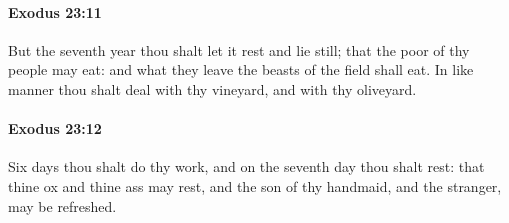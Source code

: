 		\paragraph{Exodus 23:11} %
			\label{EXODUS-23-11}

			But the seventh year thou shalt let it rest and lie still; that the poor of thy people may eat: and what they leave the beasts of the field shall eat. In like manner thou shalt deal with thy vineyard, and with thy oliveyard.


		\paragraph{Exodus 23:12} %
			\label{EXODUS-23-12}

			Six days thou shalt do thy work, and on the seventh day thou shalt rest: that thine ox and thine ass may rest, and the son of thy handmaid, and the stranger, may be refreshed.

